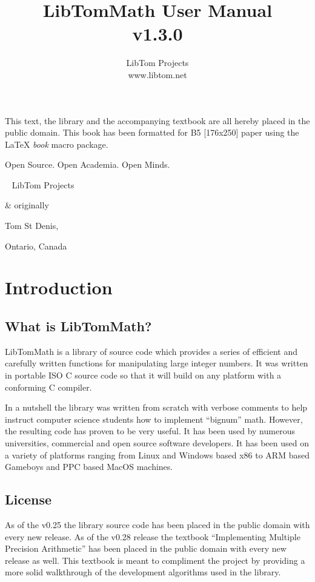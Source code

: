 \documentclass[synpaper]{book}
\begin{document}
\frontmatter
\pagestyle{empty}
\title{LibTomMath User Manual \\ v1.3.0}
\author{LibTom Projects \\ www.libtom.net}
\maketitle
This text, the library and the accompanying textbook are all hereby placed in the public domain.
This book has been
formatted for B5 [176x250] paper using the \LaTeX{} {\em book} macro package.

\vspace{10cm}

\begin{flushright}Open Source.	Open Academia.	Open Minds.

  \mbox{ }
  LibTom Projects

  \& originally

  Tom St Denis,

  Ontario, Canada
\end{flushright}

\tableofcontents
\listoffigures
\mainmatter
\pagestyle{headings}
\chapter{Introduction}
\section{What is LibTomMath?}
LibTomMath is a library of source code which provides a series of efficient and carefully written
functions for manipulating large integer numbers. It was written in portable ISO C source code so
that it will build on any platform with a conforming C compiler.

In a nutshell the library was written from scratch with verbose comments to help instruct computer
science students how to implement ``bignum'' math.  However, the resulting code has proven to be
very useful.  It has been used by numerous universities, commercial and open source software
developers.  It has been used on a variety of platforms ranging from Linux and Windows based x86 to
ARM based Gameboys and PPC based MacOS machines.

\section{License}
As of the v0.25 the library source code has been placed in the public domain with every new
release. As of the v0.28 release the textbook ``Implementing Multiple Precision Arithmetic'' has
been placed in the public domain with every new release as well.  This textbook is meant to
compliment the project by providing a more solid walkthrough of the development algorithms used in
the library.
\end{document}
